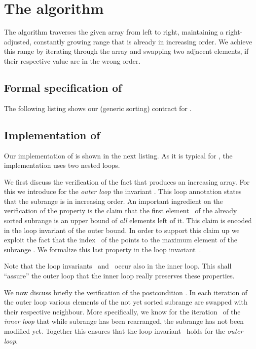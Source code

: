 
\section{The \bubblesort algorithm}
\label{sec:bubblesort}

The \bubblesort algorithm traverses the given array  from left
to right, maintaining a right-adjusted, constantly growing range
 that is already in increasing order.
We achieve this range by iterating through the array and swapping two adjacent
elements, if their respective value are in the wrong order.


\subsection{Formal specification of \bubblesort}

The following listing shows our (generic sorting) contract for \bubblesort.




\subsection{Implementation of \bubblesort}

Our implementation of \bubblesort is shown in the next listing.
As it is typical for \bubblesort, the implementation uses two nested loops.

We first discuss the verification of the fact that
\bubblesort produces an increasing array.
For this we introduce for the \emph{outer loop} the invariant .
This loop annotation states that the subrange  is in increasing order.
An important ingredient on the verification of the  property
is the claim that the first element~ of the already sorted
subrange is an upper bound of \emph{all} elements left of it.
This claim is encoded in the loop invariant  of the outer bound.
%
In order to support this claim up we exploit the fact
that the index~ of the  points to the maximum element
of the subrange .
We formalize this last property in the loop invariant~.

Note that the loop invariants~ and~ occur also
in the inner loop. This shall ``assure'' the outer loop that
the inner loop really preserves these properties.



We now discuss briefly the verification of the postcondition .
In each iteration of the outer loop various elements of the 
not yet sorted subrange  are swapped with their respective 
neighbour.
More specifically, we know for the iteration~ of the \emph{inner loop}
that while subrange  has been rearranged,
the subrange  has not been modified yet.
Together this ensures that the loop invariant~
holds for the \emph{outer loop}.

\clearpage

